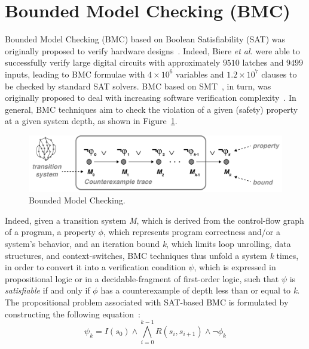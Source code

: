 \documentclass[format=acmsmall, review=false, screen=true]{acmart}
\begin{document}

\section{Bounded Model Checking (BMC)}
\label{Preliminaries}

Bounded Model Checking (BMC) based on Boolean Satisfiability (SAT) was originally proposed to verify hardware designs~\cite{Biere99,handbook09}. Indeed, Biere {\it et al.} were able to successfully verify large digital circuits with approximately $9510$ latches and $9499$ inputs, leading to BMC formulae with $4 \times 10^6$ variables and $1.2 \times 10^7$ clauses to be checked by standard SAT solvers. BMC based on SMT~\cite{BarrettSST09}, in turn, was originally proposed to deal with increasing software verification complexity~\cite{Armando2009}. 
%
In general, BMC techniques aim to check the violation of a given (safety) property at a given system depth, as shown in Figure~\ref{bounded-model-checking}. 
%
\begin{figure}[h]
	\centering
	\includegraphics[scale=0.5]{figure2.jpg}
	\caption{Bounded Model Checking.}
	\label{bounded-model-checking}
\end{figure}

Indeed, given a transition system \textit{M}, which is derived from the control-flow graph of a program, a property $\phi$, which represents program correctness and/or a system's behavior, and an iteration bound \textit{k}, which limits loop unrolling, data structures, and context-switches, BMC techniques thus unfold a system \textit{k} times, in order to convert it into a verification condition $\psi$, which is expressed in propositional logic or in a decidable-fragment of first-order logic, such that $\psi$ is \textit{satisfiable} if and only if $\phi$ has a counterexample of depth less than or equal to \textit{k}. The propositional problem associated with SAT-based BMC is formulated by constructing the following equation~\cite{Biere99}:
%
\begin{equation}
\label{bounded-model-checking-biere}
\psi_{k} = I\left(s_{0}\right) \wedge \bigwedge^{k-1}_{i=0} R\left(s_{i},s_{i+1}\right) \wedge \neg \phi_{k}
\end{equation}
\end{document}

